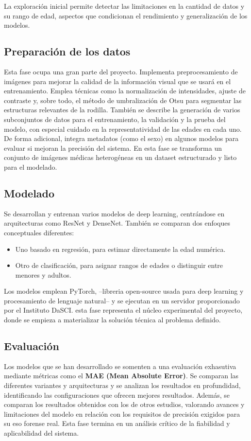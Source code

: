 \documentclass{../../../miPlantilla}
\begin{document}
La exploración inicial permite detectar las limitaciones en la cantidad de datos y su rango
de edad, aspectos que condicionan el rendimiento y generalización de los modelos.

\subsection{Preparación de los datos}
Esta fase ocupa una gran parte del proyecto. Implementa preprocesamiento de imágenes para
mejorar la calidad de la información visual que se usará en el entrenamiento. Emplea técnicas
como la normalización de intensidades, ajuste de contraste y, sobre todo, el método de 
umbralización de Otsu para segmentar las estructuras relevantes de la rodilla. También se
describe la generación de varios subconjuntos de datos para el entrenamiento, la validación
y la prueba del modelo, con especial cuidado en la representatividad de las edades en cada uno.
De forma adicional, integra metadatos (como el sexo) en algunos modelos para evaluar si mejoran
la precisión del sistema. En esta fase se transforma un conjunto de imágenes médicas heterogéneas
en un dataset estructurado y listo para el modelado.

\subsection{Modelado}
Se desarrollan y entrenan varios modelos de deep learning, centrándose en arquitecturas como ResNet
y DenseNet. También se comparan dos enfoques conceptuales diferentes:
\begin{itemize}
  \item Uno basado en regresión, para estimar directamente la edad numérica.
  \item Otro de clasificación, para asignar rangos de edades o distinguir entre menores y adultos.
\end{itemize}
Los modelos emplean PyTorch, --libreria open-source usada para deep learning y procesamiento de
lenguaje natural-- y se ejecutan en un servidor proporcionado por el Instituto DaSCI.
esta fase representa el núcleo experimental del proyecto, donde se empieza a materializar la 
solución técnica al problema definido.

\subsection{Evaluación}
Los modelos que se han desarrollado se somenten a una evaluación exhasutiva mediante métricas
como el \textbf{MAE (Mean Absolute Error)}. Se comparan las diferentes variantes y arquitecturas 
y se analizan los resultados en profundidad, identificando las configuraciones que ofrecen
mejores resultados. Además, se comparan los resultados obtenidos con los de otros estudios,
valorando avances y limitaciones del modelo en relación con los requisitos de precisión exigidos
para su eso forense real. Esta fase termina en un análisis crítico de la fiabilidad y aplicabilidad
del sistema.
\end{document}

